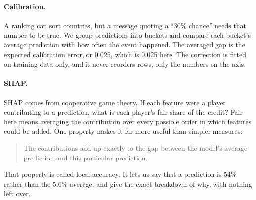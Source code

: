 \documentclass[10pt]{article}
\begin{document}
\paragraph{Calibration.} A ranking can sort countries, but a message quoting a ``30\%
chance'' needs that number to be true. We group predictions into buckets and compare each
bucket's average prediction with how often the event happened. The averaged gap is
the expected calibration error, or 0.025, which is 0.025 here. The correction is fitted on
training data only, and it never reorders rows, only the numbers on the axis.

\paragraph{SHAP.} SHAP comes from cooperative game theory. If each feature were a player
contributing to a prediction, what is each player's fair share of the credit? Fair here
means averaging the contribution over every possible order in which features could be
added. One property makes it far more useful than simpler measures:

\begin{quote}
\small The contributions add up exactly to the gap between the model's average prediction
and this particular prediction.
\end{quote}

That property is called local accuracy. It lets us say that a prediction is 54\% rather
than the 5.6\% average, and give the exact breakdown of why, with nothing left over.
\end{document}
